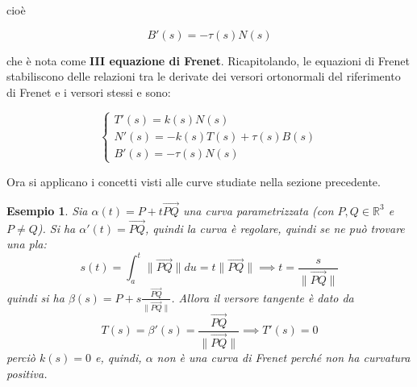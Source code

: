 \documentclass[12pt]{scrartcl}
\theoremstyle{style}
\newtheorem{esempio}{Esempio}[section]
\newenvironment{boxenv}[1][]{
    \begin{eqbox}[#1]
    }{
   \end{eqbox}
}
\numberwithin{equation}{subsection}
\renewcommand{\textbf}[1]{\textsf{\bfseries #1}}
\begin{document}
cio\`e
\begin{boxenv}[]
\begin{equation}
	B'(s) = - \tau (s) N(s)
\end{equation}
\end{boxenv}
\noindent che \`e nota come \textbf{III equazione di Frenet}.
Ricapitolando, le equazioni di Frenet stabiliscono delle relazioni tra le derivate dei versori ortonormali del riferimento di Frenet e i versori stessi e sono:
\begin{boxenv}[]
\begin{equation}
	\begin{cases}
		T'(s) = k(s) N(s)\\
		N'(s) = - k(s) T(s) + \tau (s) B(s)\\
		B'(s)=-\tau (s) N(s)
	\end{cases}
\end{equation}
\end{boxenv}
\noindent Ora si applicano i concetti visti alle curve studiate nella sezione precedente.
\begin{esempio}
	Sia $\alpha (t) = P + t \overrightarrow{PQ}$ una curva parametrizzata (con $P,Q \in \mathbb{R}^3$ e $P\neq Q$). 
	Si ha $\alpha '(t) = \overrightarrow{PQ}$, quindi la curva \`e regolare, quindi se ne pu\`o trovare una pla:
	\[
		s(t) = \int_{a} ^t \lVert \overrightarrow{PQ} \rVert du= t \lVert \overrightarrow{PQ} \rVert \implies t = \frac{s}{\lVert \overrightarrow{PQ} \rVert }
	\] 
	quindi si ha $\beta (s) = P + s \frac{\overrightarrow{PQ}}{\lVert \overrightarrow{PQ} \rVert }$. 
	Allora il versore tangente \`e dato da 
	\[
	T(s) = \beta '(s) = \frac{\overrightarrow{PQ}}{\lVert \overrightarrow{PQ} \rVert } \implies T'(s) = 0 
	\] 
	perci\`o $k(s) = 0$ e, quindi, $\alpha $ non \`e una curva di Frenet perch\'e non ha curvatura positiva.
\end{esempio}
\end{document}
